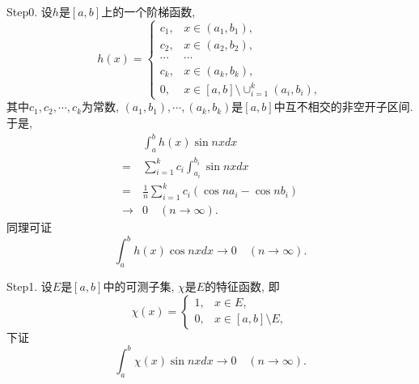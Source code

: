 \documentclass[UTF8,oneside,12pt]{article}  %
\makeatletter
\theoremstyle{DingLi1}
\numberwithin{equation}{section}
\theoremstyle{DingLi2}
\renewenvironment{proof}[1][\proofname]{\par%
\pushQED{\qed}%
\normalfont \topsep6\p@\@plus6\p@\relax%
\trivlist%
\item[\hskip\labelsep%
#1]\ignorespaces%
}{%
\popQED\endtrivlist\@endpefalse%
}
\renewcommand{\proofname}{\heiti\large\color{blue} 证明}%
\makeatother
\begin{document}
\begin{proof}

Step0. 设$h$是$[a,b]$上的一个阶梯函数,
$$
h(x)
=\left\{\begin{array}{ll}
c_1,&x\in (a_1,b_1),\\
c_2,&x\in(a_2,b_2),\\
\cdots&\cdots\\
c_k,&x\in (a_k,b_k),\\
0,&x\in [a,b]\setminus\cup_{i=1}^k(a_i,b_i),
\end{array}\right.
$$
其中$c_1,c_2,\cdots,c_k$为常数, $(a_1,b_1),\cdots,(a_k,b_k)$是$[a,b]$中互不相交的非空开子区间. 于是,
$$
\begin{aligned}
&\int_a^b h(x)\sin nx dx\\
=&\sum_{i=1}^k c_i\int_{a_i}^{b_i}\sin nx dx\\
=&\frac{1}{n}\sum_{i=1}^k c_i(\cos na_i-\cos n b_i)\\
\to&0\quad(n\to\infty).
\end{aligned}
$$
同理可证
$$\int_a^b h(x)\cos nx dx\to 0\quad (n\to \infty).$$

Step1.
设$E$是$[a,b]$中的可测子集, $\chi$是$E$的特征函数, 即
$$
\chi(x)
=\left\{\begin{array}{ll}
1,&x\in E,\\
0,&x\in[a,b]\setminus E,
\end{array}\right.
$$
下证
$$\int_a^b \chi(x)\sin nx dx\to 0\quad (n\to \infty).$$


\end{proof}
\end{document}
